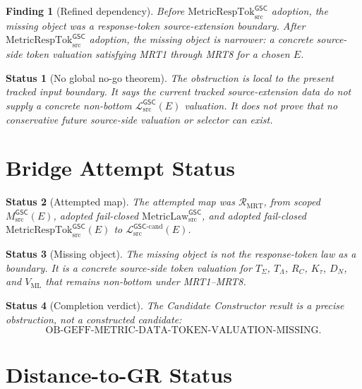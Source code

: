 \documentclass[11pt]{article}
\newcommand{\MsrcGSC}{M_{\mathrm{src}}^{\mathsf{GSC}}}
\newcommand{\MetricLaw}{\mathrm{MetricLaw}_{\mathrm{src}}^{\mathsf{GSC}}}
\newcommand{\MetricRespTok}{\mathrm{MetricRespTok}_{\mathrm{src}}^{\mathsf{GSC}}}
\newcommand{\MetricData}{\mathcal{L}_{\mathrm{src}}^{\mathsf{GSC}}}
\newcommand{\MetricDataCand}{\mathcal{L}_{\mathrm{src}}^{\mathsf{GSC}\mbox{-}\mathrm{cand}}}
\newtheorem{finding}{Finding}
\newtheorem{status}{Status}
\begin{document}
\begin{finding}[Refined dependency]
Before \(\MetricRespTok\) adoption, the missing object was a response-token
source-extension boundary. After \(\MetricRespTok\) adoption, the missing
object is narrower: a concrete source-side token valuation satisfying MRT1
through MRT8 for a chosen \(E\).
\end{finding}

\begin{status}[No global no-go theorem]
The obstruction is local to the present tracked input boundary. It says the
current tracked source-extension data do not supply a concrete non-bottom
\(\MetricData(E)\) valuation. It does not prove that no conservative future
source-side valuation or selector can exist.
\end{status}

\section{Bridge Attempt Status}

\begin{status}[Attempted map]
The attempted map was \(\mathcal{R}_{\mathrm{MRT}}\), from scoped
\(\MsrcGSC(E)\), adopted fail-closed \(\MetricLaw\), and adopted
fail-closed \(\MetricRespTok(E)\) to \(\MetricDataCand(E)\).
\end{status}

\begin{status}[Missing object]
The missing object is not the response-token law as a boundary. It is a
concrete source-side token valuation for \(T_{\Sigma}\), \(T_{\Lambda}\),
\(R_C\), \(K_{\tau}\), \(D_N\), and \(V_{\mathrm{ML}}\) that remains
non-bottom under MRT1--MRT8.
\end{status}

\begin{status}[Completion verdict]
The Candidate Constructor result is a precise obstruction, not a constructed
candidate:
\[
  \mathrm{OB\mbox{-}GEFF\mbox{-}METRIC\mbox{-}DATA\mbox{-}TOKEN\mbox{-}VALUATION\mbox{-}MISSING}.
\]
\end{status}

\section{Distance-to-GR Status}
\end{document}
